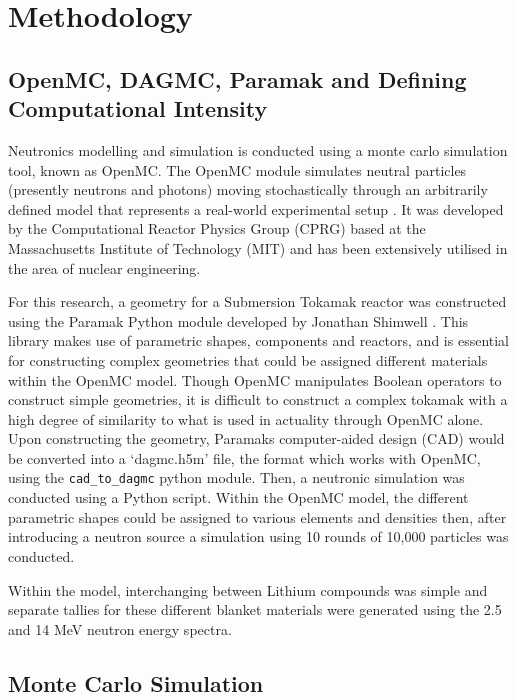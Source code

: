 \documentclass{article}
\begin{document}
\section{Methodology}
\label{sec:methodology}

\subsection{OpenMC, DAGMC, Paramak and Defining Computational Intensity}

Neutronics modelling and simulation is conducted using a monte carlo simulation tool, known as OpenMC. The OpenMC module simulates neutral particles (presently neutrons and photons) moving stochastically through an arbitrarily defined model that represents a real-world experimental setup \cite{rhhnfs15}. It was developed by the Computational Reactor Physics Group (CPRG) based at the Massachusetts Institute of Technology (MIT) and has been extensively utilised in the area of nuclear engineering.

For this research, a geometry for a Submersion Tokamak reactor was constructed using the Paramak Python module developed by Jonathan Shimwell \cite{sbdchstebmhmidppfs21}. This library makes use of parametric shapes, components and reactors, and is essential for constructing complex geometries that could be assigned different materials within the OpenMC model. Though OpenMC manipulates Boolean operators to construct simple geometries, it is difficult to construct a complex tokamak with a high degree of similarity to what is used in actuality through OpenMC alone. Upon constructing the geometry, Paramaks computer-aided design (CAD) would be converted into a ‘dagmc.h5m’ file, the format which works with OpenMC, using the \texttt{cad\_to\_dagmc} python module. Then, a neutronic simulation was conducted using a Python script. Within the OpenMC model, the different parametric shapes could be assigned to various elements and densities then, after introducing a neutron source a simulation using 10 rounds of 10,000 particles was conducted.

Within the model, interchanging between Lithium compounds was simple and separate tallies for these different blanket materials were generated using the 2.5 and 14 MeV neutron energy spectra.

\subsection{Monte Carlo Simulation}
\end{document}
